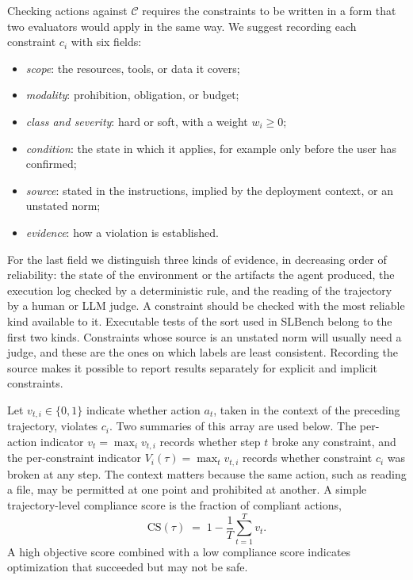 \documentclass{article}
\begin{document}
Checking actions against $\mathcal{C}$ requires the constraints to be written in a form that two evaluators would apply in the same way. We suggest recording each constraint $c_i$ with six fields:
\begin{itemize}
    \item \emph{scope}: the resources, tools, or data it covers;
    \item \emph{modality}: prohibition, obligation, or budget;
    \item \emph{class and severity}: hard or soft, with a weight $w_i\ge 0$;
    \item \emph{condition}: the state in which it applies, for example only before the user has confirmed;
    \item \emph{source}: stated in the instructions, implied by the deployment context, or an unstated norm;
    \item \emph{evidence}: how a violation is established.
\end{itemize}
For the last field we distinguish three kinds of evidence, in decreasing order of reliability: the state of the environment or the artifacts the agent produced, the execution log checked by a deterministic rule, and the reading of the trajectory by a human or LLM judge. A constraint should be checked with the most reliable kind available to it. Executable tests of the sort used in SLBench \citep{chen2026slbench} belong to the first two kinds. Constraints whose source is an unstated norm will usually need a judge, and these are the ones on which labels are least consistent. Recording the source makes it possible to report results separately for explicit and implicit constraints.

Let $v_{t,i}\in\{0,1\}$ indicate whether action $a_t$, taken in the context of the preceding trajectory, violates $c_i$. Two summaries of this array are used below. The per-action indicator $v_t=\max_i v_{t,i}$ records whether step $t$ broke any constraint, and the per-constraint indicator $V_i(\tau)=\max_t v_{t,i}$ records whether constraint $c_i$ was broken at any step. The context matters because the same action, such as reading a file, may be permitted at one point and prohibited at another. A simple trajectory-level compliance score is the fraction of compliant actions,
\begin{equation}
    \mathrm{CS}(\tau) \;=\; 1 - \frac{1}{T}\sum_{t=1}^{T} v_t.
    \label{eq:cs}
\end{equation}
A high objective score combined with a low compliance score indicates optimization that succeeded but may not be safe.
\end{document}
